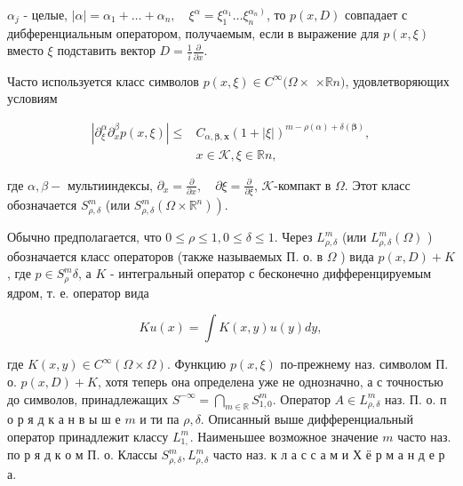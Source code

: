 \documentclass[10pt]{article}
\begin{document}
$\alpha_{j}$ - целые, $|\alpha|=\alpha_{1}+\ldots+\alpha_{n}, \quad \xi^{\alpha}=\xi_{1}^{\alpha_{1}} \ldots \xi_{n}^{\left.\alpha_{n}\right)}$, то $p(x, D)$ совпадает с дибференциальным оператором, получаемым, если в выражение для $p(x, \xi)$ вместо $\xi$ подставить вектор $D=\frac{1}{i} \frac{\partial}{\partial x}$.



Часто используется класс символов $p(x, \xi) \in C^{\infty}(\Omega \times$ $\times \mathbb{R} n)$, удовлетворяющих условиям



\[

\begin{aligned}

\left|\partial_{\xi}^{\alpha} \partial_{x}^{\beta} p(x, \xi)\right| \leqslant & C_{\alpha, \boldsymbol{\beta}, \boldsymbol{x}}(1+|\xi|)^{m-\rho(\alpha)+\delta(\boldsymbol{\beta})}, \\

& x \in \mathscr{K}, \xi \in \mathbb{R} n,

\end{aligned}

\]



где $\alpha, \beta-$ мультииндексы, $\partial_{x}=\frac{\partial}{\partial x}, \quad \partial \xi=\frac{\partial}{\partial \xi}$, $\mathscr{K}$-компакт в $\Omega$. Этот класс обозначается $S_{\rho, \delta}^{m}$ (или $\left.S_{\rho, \delta}^{m}\left(\Omega \times \mathbb{R}^{n}\right)\right)$.



Обычно предполагается, что $0 \leqslant \rho \leqslant 1,0 \leqslant \delta \leqslant 1$. Через $L_{\rho, \delta}^{m}$ (или $L_{\rho, \delta}^{m}(\Omega)$ ) обозначается класс операторов (также называемых П. о. в $\Omega$ ) вида $p(x, D)+K$, где $p \in S_{\rho}^{m} \delta$, а $K$ - интегральный оператор с бесконечно дифференцируемым ядром, т. е. оператор вида



\[

K u(x)=\int K(x, y) u(y) d y,

\]



где $K(x, y) \in C^{\infty}(\Omega \times \Omega)$. Функцию $p(x, \xi)$ по-прежнему наз. символом П. о. $p(x, D)+K$, хотя теперь она определена уже не однозначно, а с точностью до символов, принадлежащих $S^{-\infty}=\bigcap_{m \in \mathbb{R}} S_{1,0}^{m}$. Оператор $A \in L_{\rho, \delta}^{m}$ наз. П. о. п о р я д к а н в ы ш е $m$ и ти па $\rho, \delta$. Описанный выше дифференциальный оператор принадлежит классу $L_{1,}^{m}$. Наименьшее возможное значение $m$ часто наз. по р я д к о м П. о. Классы $S_{\rho, \delta}^{m}, L_{\rho, \delta}^{m}$ часто наз. к л а с с а м и Х ё р м а н д е р а.
\end{document}
